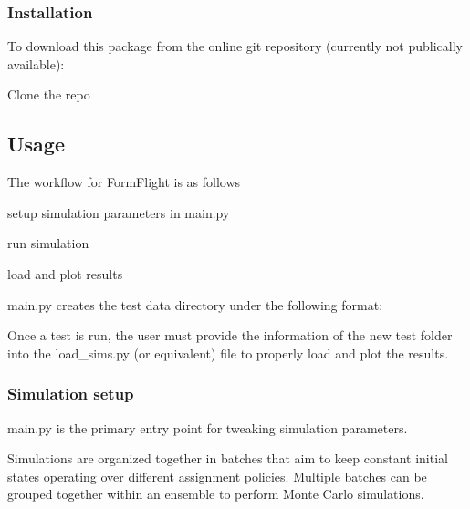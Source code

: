 \subsubsection*{Installation}

To download this package from the online git repository (currently not publically available)\+:


\begin{DoxyEnumerate}
\item Clone the repo 
\begin{DoxyCode}{0}
\end{DoxyCode}

\end{DoxyEnumerate}

\subsection*{Usage}

The workflow for Form\+Flight is as follows
\begin{DoxyEnumerate}
\item setup simulation parameters in main.\+py
\item run simulation
\item load and plot results
\end{DoxyEnumerate}

main.\+py creates the test data directory under the following format\+: 
\begin{DoxyCode}{0}
\end{DoxyCode}


Once a test is run, the user must provide the information of the new test folder into the load\+\_\+sims.\+py (or equivalent) file to properly load and plot the results.

\subsubsection*{Simulation setup}

main.\+py is the primary entry point for tweaking simulation parameters.

Simulations are organized together in batches that aim to keep constant initial states operating over different assignment policies. Multiple batches can be grouped together within an ensemble to perform Monte Carlo simulations.

